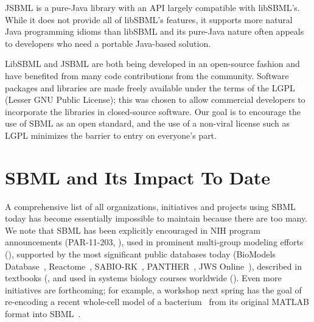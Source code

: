 JSBML is a pure-Java library with an API largely compatible with libSBML's.  While it does not provide all of  libSBML's features, it supports more natural Java programming idioms than libSBML and its pure-Java nature often appeals to developers who need a portable Java-based solution. 

LibSBML and JSBML are both being developed in an open-source fashion and have benefited from many code contributions from the community. 
Software packages and libraries  are made freely available under the terms of the LGPL (Lesser GNU Public License); this was chosen to allow commercial developers to incorporate the libraries in closed-source software.  
Our goal is to encourage the use of SBML as an open standard, and the use of a non-viral license such as LGPL minimizes the barrier to entry on everyone's part.


\section{SBML and Its Impact To Date}

A comprehensive list of all organizations, initiatives and projects using SBML today has become essentially impossible to maintain because there are too many.  We note that SBML has been explicitly encouraged in NIH program announcements (\eg PAR-11-203, \cite{nih_2011}), used in prominent multi-group modeling efforts (\eg \cite{herrgard_2008, duarte_2007, ma_2007}), supported by the most significant public databases today (\eg BioModels Database~\cite{lenovere_2006, li_2010, biomodelsweb}, Reactome~\cite{joshitope_2005,matthews_2009}, SABIO-RK~\cite{wittig_2012, sabiork_2014}, PANTHER~\cite{panther_2014, mi_2013}, JWS Online~\cite{olivier_2004b, jwsonline_2014}), described in textbooks (\eg \cite{Cesario:CancerSystemsBiologyBioinformaticsAndMedicine:2011, Sullivan:IntroductionToDataMiningForTheLife:2011, Wilkinson:StochasticModellingForSystemsBiology:2011, Klipp:SystemsBiologyATextbook:2011, Wittmann:BiosystemsEngineering:2010, Choi:SystemsBiologyForSignalingNetworks:2010, Govindjee:PhotosynthesisInSilicoUnderstandingComplexityFromMolecules:2009, Liu:SystemsBiomedicineConceptsAndPerspectives:2009, Choi:IntroductionToSystemsBiology:2007, Kriete:ComputationalSystemsBiology:2006}, and used in systems biology courses worldwide (\eg \cite{ccb_2012, LeNov3013, Goryanin2012, Pahle2012, vanRiel2012, Buechel2012, Henneges2010, Schroeder2009, Henneges2008, Zell2008, Draeger2007, Wolkenhauer2012a, Wolkenhauer2012b, Moraru2012, Owen2012a, Thul2012, Owen2012b, Monk2012, Mendes2012, SBMLEBI2014, SBMLCAMU2014, SBMLEBI2013, SBMLEBI2012, SBMLSIB2011, SBMLCRG2011, SBMLiGEM2009, SBMLEBI2009, SBMLiGEM2007, SBMLOIST2006, SBMLSymbionic2005, adams_2008, adams_2009, adams_2010, mosyb_2013, biomodlat_2012, erasysapp_2014}).  Even more initiatives are forthcoming; for example, a workshop next spring has the goal of re-encoding a recent whole-cell model of a bacterium~\cite{karr_2012} from its original MATLAB format into SBML~\cite{waltemath_2015}.


